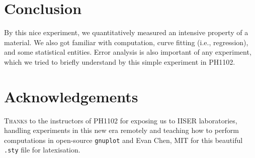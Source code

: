 \documentclass[11pt]{scrartcl}
\begin{document}
\section{Conclusion}
By this nice experiment, we quantitatively measured an intensive property of a material. We also got familiar with computation, curve fitting (i.e., regression), and some statistical entities. Error analysis is also important of any experiment, which we tried to briefly understand by this simple experiment in PH1102.

\section{Acknowledgements}
\textsc{Thanks} to the instructors of PH1102 for exposing us to IISER laboratories, handling experiments in this new era remotely and teaching how to perform computations in open-source \texttt{gnuplot} and Evan Chen, MIT for this beautiful \texttt{.sty} file for latexisation.
\end{document}

